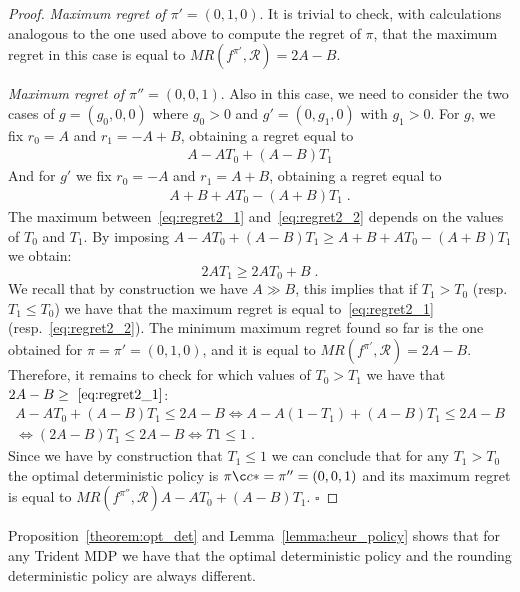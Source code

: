 \begin{proof}
\textit{Maximum regret of $\pi' = (0, 1, 0)$}.
It is trivial to check, with calculations analogous to the one used above to compute the regret of $\pi$, that the maximum regret in this case is equal to $MR(f^{\pi'}, \mathcal{R}) = 2A-B$.


\textit{Maximum regret of $\pi'' = (0, 0, 1)$}.
Also in this case, we need to consider the two cases of $g =(g_0, 0 ,0)$ where $g_0 > 0$ and $g' = (0, g_1, 0)$ with $g_1 > 0$. For $g$, we fix $r_0 = A$ and $r_1 = -A+B$, obtaining a regret equal to 
\vspace{-0.2cm}
\begin{align}
A- A T_0 +(A-B) T_1 \label{eq:regret2_1}
\end{align}
And for $g'$ we fix $r_0 = -A$ and $r_1 = A+B$, obtaining a regret equal to 
\vspace{-0.2cm}
\begin{align}
A+B+A T_0 -(A+B) T_1\;. \label{eq:regret2_2}
\end{align}
The maximum between~\eqref{eq:regret2_1} and~\eqref{eq:regret2_2} depends on the values of $T_0$ and $T_1$.
By imposing  $A- A T_0 +(A-B) T_1 \geq A+B+A T_0 -(A+B) T_1$ we obtain:
$$ 2A T_1 \geq 2 A T_0 + B\;. $$
We recall that by construction we have $A \gg B$, this implies that if $T_1> T_0$ (resp. $T_1\leq T_0$)  we have that the maximum regret is equal to~\eqref{eq:regret2_1} (resp.~\eqref{eq:regret2_2}).
The minimum maximum regret found so far is the one obtained for $\pi = \pi' = (0, 1, 0)$, and it is equal to $MR(f^{\pi'}, \mathcal{R}) = 2A-B$. Therefore, it remains to check for which values of $T_0 > T_1$ we have that $2A-B \geq~\eqref{eq:regret2_1}$:
\vspace{-0.2cm}
\begin{align*}
A- A T_0 +(A-B) T_1 \leq 2A - B \Leftrightarrow A- A (1-T_1) +(A-B) T_1 \leq 2A - B\\
  \Leftrightarrow (2A-B)T_1 \leq 2A-B  \Leftrightarrow T1 \leq 1\;.
\end{align*}
 Since we have by construction that $T_1 \leq1$ we can conclude that for any $T_1> T_0$ the optimal deterministic policy is $\piç* = \pi''= (0, 0,1)$ and its maximum regret is equal to $MR(f^{\pi''}, \mathcal{R})A- A T_0 +(A-B) T_1$. $\square$
\end{proof}

Proposition~\ref{theorem:opt_det} and Lemma~\ref{lemma:heur_policy} shows that for any Trident MDP we have that the optimal deterministic policy and the rounding deterministic policy are always different. 


